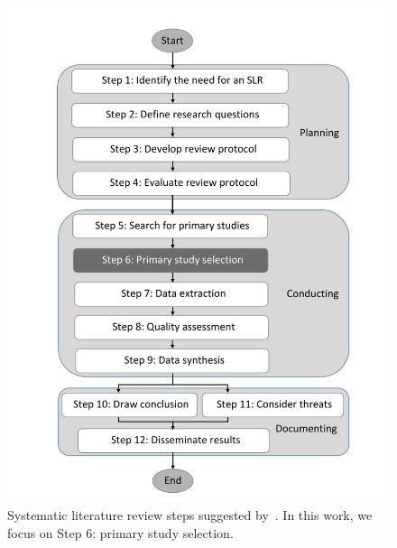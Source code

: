 \documentclass{svjour3}
\theoremstyle{break}
\begin{document}
\begin{figure}[t]
    \centering
    \begin{minipage}[t]{.51\linewidth}
    \includegraphics[width=\linewidth]{procedure.pdf}
    \caption{Systematic literature review steps suggested by~\cite{keele2007guidelines}. In this work, we focus on Step 6: primary study selection.}
    \label{fig: slr}
    \end{minipage}\quad
    \begin{minipage}[t]{.45\linewidth}

\end{minipage}
\end{figure}
\end{document}
